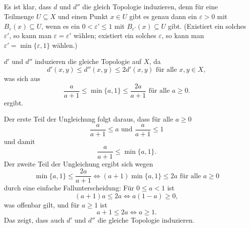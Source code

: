 \documentclass[a4paper,10pt]{article}
\begin{document}
\subsection{}
Es ist klar, dass $d$ und $d''$ die gleich Topologie induzieren, denn für eine Teilmenge $U \subseteq X$ und einen Punkt $x \in U$ gibt es genau dann ein $\varepsilon > 0$ mit $B_\varepsilon(x) \subseteq U$, wenn es ein $0 < \varepsilon’ \leq 1$ mit $B_{\varepsilon'}(x) \subseteq U$ gibt. (Existiert ein solches $\varepsilon'$, so kann man $\varepsilon = \varepsilon'$ wählen; existiert ein solches $\varepsilon$, so kann man $\varepsilon' = \min\{\varepsilon,1\}$ wählen.)

$d'$ und $d''$ induzieren die gleiche Topologie auf $X$, da
\[
 d'(x,y) \leq d''(x,y) \leq 2d'(x,y) \text{ für alle } x,y \in X,
\]
was sich aus
\[
 \frac{a}{a+1} \leq \min\{a,1\} \leq \frac{2a}{a+1} \text{ für alle } a \geq 0.
\]
ergibt.

Der erste Teil der Ungleichung folgt daraus, dass für alle $a \geq 0$
\[
 \frac{a}{a+1} \leq a \text{ und } \frac{a}{a+1} \leq 1
\]
und damit
\[
 \frac{a}{a+1} \leq \min\{a,1\}.
\]
Der zweite Teil der Ungleichung ergibt sich wegen
\[
 \min\{a,1\} \leq \frac{2a}{a+1}
 \Leftrightarrow (a+1)\min\{a,1\} \leq 2a \text{ für alle } a \geq 0
\]
durch eine einfache Fallunterscheidung: Für $0 \leq a < 1$ ist
\[
 (a+1)a \leq 2a \Leftrightarrow a(1-a) \geq 0,
\]
was offenbar gilt, und für $a \geq 1$ ist
\[
 a+1 \leq 2a \Leftrightarrow a \geq 1.
\]
Das zeigt, dass auch $d'$ und $d''$ die gleiche Topologie induzieren.
\end{document}
